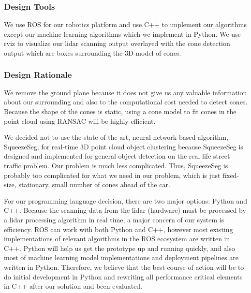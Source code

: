 \documentclass[10pt, onecolumn, draftclsnofoot, letterpaper,compsoc]{IEEEtran}
\begin{document}
\subsubsection{Design Tools} %
We use ROS for our robotics platform and use C++ to implement our algorithms except our machine learning algorithms which we implement in Python. We use rviz to visualize our lidar scanning output overlayed with the cone detection output which are boxes surrounding the 3D model of cones.

\subsubsection{Design Rationale} %
We remove the ground plane because it does not give us any valuable information about our surrounding and also to the computational cost needed to detect cones. Because the shape of the cones is static, using a cone model to fit cones in the point cloud using RANSAC will be highly efficient.

We decided not to use the state-of-the-art, neural-network-based  algorithm, SqueezeSeg, for real-time 3D point cloud object clustering because SqueezeSeg is designed and implemented for general object detection on the real life street traffic problem. Our problem is much less complicated. Thus, SqueezeSeg is probably too complicated for what we need in our problem, which is just fixed-size, stationary, small number of cones ahead of the car.

For our programming language decision, there are two major options: Python and C++. Because the scanning data from the lidar (hardware) must be processed by a lidar processing algorithm in real time, a major concern of our system is efficiency. ROS can work with both Python and C++, however most existing implementations of relevant algorithms in the ROS ecosystem are written in C++. Python will help us get the prototype up and running quickly, and also most of machine learning model implementations and deployment pipelines are written in Python.  Therefore, we believe that the best course of action will be to do initial development in Python and rewriting all performance critical elements in C++ after our solution and been evaluated.

\newpage
\end{document}
